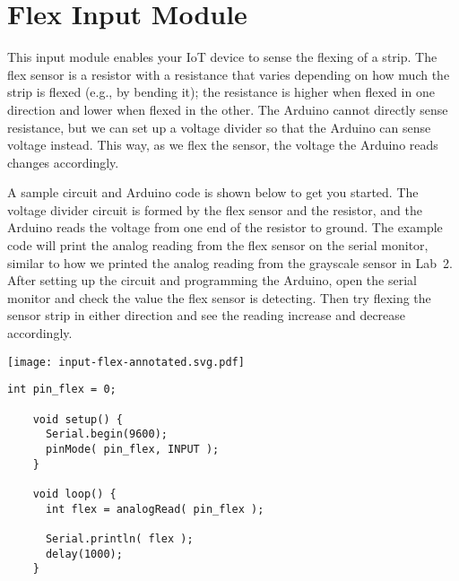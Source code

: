 
\clearpage
\section{Flex Input Module}
\label{sec-input-flex}

This input module enables your IoT device to sense the flexing of a
 strip. The flex sensor is a resistor with a resistance that
varies depending on how much the strip is flexed (e.g., by bending it);
the resistance is higher when flexed in one direction and lower when
flexed in the other. The Arduino cannot directly sense resistance, but
we can set up a voltage divider so that the Arduino can sense voltage
instead. This way, as we flex the sensor, the voltage the Arduino reads
changes accordingly.


A sample circuit and Arduino code is shown below to get you started.
The voltage divider circuit is formed by the flex sensor and the
 resistor, and the Arduino reads the voltage from one end
of the resistor to ground. The example code will print the analog
reading from the flex sensor on the serial monitor, similar to how we
printed the analog reading from the grayscale sensor in Lab~2. After
setting up the circuit and programming the Arduino, open the serial
monitor and check the value the flex sensor is detecting. Then try
flexing the sensor strip in either direction and see the reading
increase and decrease accordingly.

\vspace{0.1in}
\begin{minipage}[t]{0.49\tw}
  \vspace{0pt}

  \texttt{[image: input-flex-annotated.svg.pdf]}
\end{minipage}
\hfill
\begin{minipage}[t]{0.49\tw}
  \vspace{0.1in}
  \begin{Verbatim}[gobble=3,fontsize=\small]
    int pin_flex = 0;

    void setup() {
      Serial.begin(9600);
      pinMode( pin_flex, INPUT );
    }

    void loop() {
      int flex = analogRead( pin_flex );

      Serial.println( flex );
      delay(1000);
    }
  \end{Verbatim}
\end{minipage}
\vspace{0.1in}

